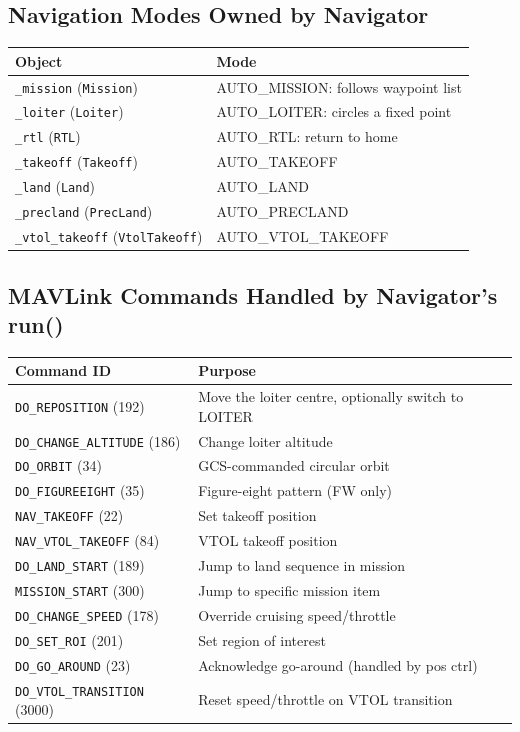 \documentclass[12pt,a4paper]{article}
\begin{document}
\subsection*{Navigation Modes Owned by Navigator}
\begin{center}\begin{tabular}{ll}\toprule
Object & Mode \\\midrule
\texttt{\_mission} (\texttt{Mission}) & AUTO\_MISSION: follows waypoint list \\
\texttt{\_loiter} (\texttt{Loiter}) & AUTO\_LOITER: circles a fixed point \\
\texttt{\_rtl} (\texttt{RTL}) & AUTO\_RTL: return to home \\
\texttt{\_takeoff} (\texttt{Takeoff}) & AUTO\_TAKEOFF \\
\texttt{\_land} (\texttt{Land}) & AUTO\_LAND \\
\texttt{\_precland} (\texttt{PrecLand}) & AUTO\_PRECLAND \\
\texttt{\_vtol\_takeoff} (\texttt{VtolTakeoff}) & AUTO\_VTOL\_TAKEOFF \\
\bottomrule\end{tabular}\end{center}

\subsection*{MAVLink Commands Handled by Navigator's run()}
\begin{center}\begin{tabular}{ll}\toprule
Command ID & Purpose \\\midrule
\texttt{DO\_REPOSITION} (192) & Move the loiter centre, optionally switch to LOITER \\
\texttt{DO\_CHANGE\_ALTITUDE} (186) & Change loiter altitude \\
\texttt{DO\_ORBIT} (34) & GCS-commanded circular orbit \\
\texttt{DO\_FIGUREEIGHT} (35) & Figure-eight pattern (FW only) \\
\texttt{NAV\_TAKEOFF} (22) & Set takeoff position \\
\texttt{NAV\_VTOL\_TAKEOFF} (84) & VTOL takeoff position \\
\texttt{DO\_LAND\_START} (189) & Jump to land sequence in mission \\
\texttt{MISSION\_START} (300) & Jump to specific mission item \\
\texttt{DO\_CHANGE\_SPEED} (178) & Override cruising speed/throttle \\
\texttt{DO\_SET\_ROI} (201) & Set region of interest \\
\texttt{DO\_GO\_AROUND} (23) & Acknowledge go-around (handled by pos ctrl) \\
\texttt{DO\_VTOL\_TRANSITION} (3000) & Reset speed/throttle on VTOL transition \\
\bottomrule\end{tabular}\end{center}
\end{document}
